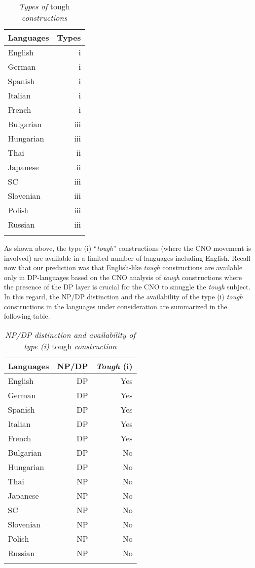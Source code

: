 \documentclass[output=paper,colorlinks,citecolor=brown,
]{langscibook}
\begin{document}
\begin{table}[H]
\caption{\textit{Types of} tough \textit{constructions}}
\label{tab:1:types}
 \begin{tabular}{l r}
  \lsptoprule
    \textbf{Languages}  & \textbf{Types}  \\
  \midrule
  English  &   i  \\
  German  &   i\\
  Spanish & i\\
  Italian & i\\
  French & i\\
  Bulgarian & iii\\
  Hungarian & iii\\
  Thai & ii\\
  Japanese & ii\\
  SC & iii\\
  Slovenian & iii\\
  Polish & iii\\
  Russian & iii\\
  \lspbottomrule
 \end{tabular}
\end{table}

As shown above, the type (i) “\textit{tough}” constructions (where the CNO movement is involved) are available in a limited number of languages including English. Recall now that our prediction was that English-like \textit{tough} constructions are available only in DP-languages based on the CNO analysis of \textit{tough} constructions where the presence of the DP layer is crucial for the CNO to smuggle the \textit{tough} subject. In this regard, the NP/DP distinction and the availability of the type (i) \textit{tough} constructions in the languages under consideration are summarized in the following table. 

\begin{table}[H]
\caption{\textit{NP/DP distinction and availability of type (i)} tough \textit{construction}}
\label{tab:2:npdp}
 \begin{tabular}{l rr}
  \lsptoprule
     \textbf{Languages}  & \textbf{NP/DP} & \textbf{\textit{Tough} (i)}\\
  \midrule
  English  &   DP  &    Yes  \\
  German  &   DP &   Yes  \\
    Spanish  &   DP &   Yes  \\
    Italian  &   DP &   Yes  \\
    French  &   DP &   Yes  \\
    Bulgarian  &   DP &   No  \\
    Hungarian  &   DP &   No  \\
    Thai  &   NP &   No  \\
    Japanese  &   NP &   No  \\
    SC  &   NP &   No  \\
    Slovenian  &   NP &   No  \\
    Polish  &   NP &   No  \\
    Russian  &   NP &   No  \\
  \lspbottomrule
 \end{tabular}
\end{table}
\end{document}
